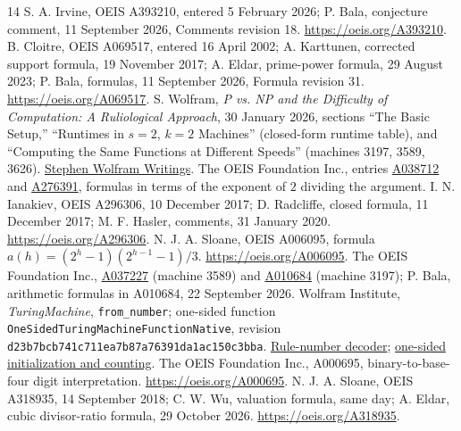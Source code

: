 \documentclass[11pt]{article}
\begin{document}
\begin{thebibliography}{14}
 S. A. Irvine, OEIS A393210, entered 5 February 2026;
P. Bala, conjecture comment, 11 September 2026, Comments revision 18.
\url{https://oeis.org/A393210}.
 B. Cloitre, OEIS A069517, entered 16 April 2002;
A. Karttunen, corrected support formula, 19 November 2017;
A. Eldar, prime-power formula, 29 August 2023; P. Bala, formulas,
11 September 2026, Formula revision 31. \url{https://oeis.org/A069517}.
 S. Wolfram, \emph{P vs. NP and the Difficulty of
Computation: A Ruliological Approach}, 30 January 2026, sections
``The Basic Setup,'' ``Runtimes in $s=2$, $k=2$ Machines''
(closed-form runtime table), and ``Computing the Same Functions at
Different Speeds'' (machines 3197, 3589, 3626).
\href{https://writings.stephenwolfram.com/2026/01/p-vs-np-and-the-difficulty-of-computation-a-ruliological-approach/}{Stephen Wolfram Writings}.
 The OEIS Foundation Inc., entries
\href{https://oeis.org/A038712}{A038712} and
\href{https://oeis.org/A276391}{A276391}, formulas in terms of the
exponent of $2$ dividing the argument.
 I. N. Ianakiev, OEIS A296306, 10 December 2017;
D. Radcliffe, closed formula, 11 December 2017; M. F. Hasler,
comments, 31 January 2020. \url{https://oeis.org/A296306}.
 N. J. A. Sloane, OEIS A006095, formula
$a(h)=(2^h-1)(2^{h-1}-1)/3$. \url{https://oeis.org/A006095}.
 The OEIS Foundation Inc.,
\href{https://oeis.org/A037227}{A037227} (machine 3589) and
\href{https://oeis.org/A010684}{A010684} (machine 3197);
P. Bala, arithmetic formulas in A010684, 22 September 2026.
 Wolfram Institute, \emph{TuringMachine},
\texttt{from\_number}; one-sided function
\texttt{OneSidedTuringMachine}\allowbreak\texttt{FunctionNative},
revision \texttt{d23b7bcb741c711ea7b87}\allowbreak\texttt{a76391da1ac150c3bba}.
\href{https://github.com/WolframInstitute/TuringMachine/blob/d23b7bcb741c711ea7b87a76391da1ac150c3bba/TuringMachine/Libs/ndtm_search/src/models.rs}{Rule-number decoder};
\href{https://github.com/WolframInstitute/TuringMachine/blob/d23b7bcb741c711ea7b87a76391da1ac150c3bba/TuringMachine/Kernel/Functions.wl}{one-sided initialization and counting}.
 The OEIS Foundation Inc., A000695, binary-to-base-four
digit interpretation. \url{https://oeis.org/A000695}.
 N. J. A. Sloane, OEIS A318935, 14 September 2018;
C. W. Wu, valuation formula, same day;
A. Eldar, cubic divisor-ratio formula, 29 October 2026.
\url{https://oeis.org/A318935}.

\end{thebibliography}
\end{document}
